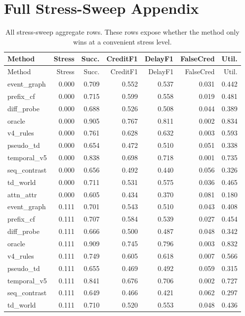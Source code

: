 \documentclass{article}
\begin{document}
\section{Full Stress-Sweep Appendix}
\begin{longtable}{@{}lrrrrrr@{}}
\caption{All stress-sweep aggregate rows. These rows expose whether the method only wins at a convenient stress level.}\\
\toprule
Method & Stress & Succ. & CreditF1 & DelayF1 & FalseCred & Util.\\
\midrule
\endfirsthead
\toprule
Method & Stress & Succ. & CreditF1 & DelayF1 & FalseCred & Util.\\
\midrule
\endhead
event\_graph & 0.000 & 0.709 & 0.552 & 0.537 & 0.031 & 0.442 \\
prefix\_cf & 0.000 & 0.715 & 0.599 & 0.558 & 0.019 & 0.481 \\
diff\_probe & 0.000 & 0.688 & 0.526 & 0.508 & 0.044 & 0.389 \\
oracle & 0.000 & 0.905 & 0.767 & 0.811 & 0.002 & 0.834 \\
v4\_rules & 0.000 & 0.761 & 0.628 & 0.632 & 0.003 & 0.593 \\
pseudo\_td & 0.000 & 0.654 & 0.472 & 0.510 & 0.051 & 0.338 \\
temporal\_v5 & 0.000 & 0.838 & 0.698 & 0.718 & 0.001 & 0.735 \\
seq\_contrast & 0.000 & 0.656 & 0.492 & 0.440 & 0.056 & 0.326 \\
td\_world & 0.000 & 0.711 & 0.531 & 0.575 & 0.036 & 0.465 \\
attn\_attr & 0.000 & 0.605 & 0.434 & 0.370 & 0.081 & 0.180 \\
event\_graph & 0.111 & 0.701 & 0.543 & 0.510 & 0.043 & 0.408 \\
prefix\_cf & 0.111 & 0.707 & 0.584 & 0.539 & 0.027 & 0.454 \\
diff\_probe & 0.111 & 0.666 & 0.500 & 0.487 & 0.048 & 0.342 \\
oracle & 0.111 & 0.909 & 0.745 & 0.796 & 0.003 & 0.832 \\
v4\_rules & 0.111 & 0.749 & 0.605 & 0.618 & 0.007 & 0.566 \\
pseudo\_td & 0.111 & 0.655 & 0.469 & 0.492 & 0.059 & 0.315 \\
temporal\_v5 & 0.111 & 0.841 & 0.676 & 0.706 & 0.002 & 0.727 \\
seq\_contrast & 0.111 & 0.649 & 0.466 & 0.421 & 0.062 & 0.297 \\
td\_world & 0.111 & 0.710 & 0.520 & 0.553 & 0.048 & 0.436 \\

\end{longtable}
\end{document}
